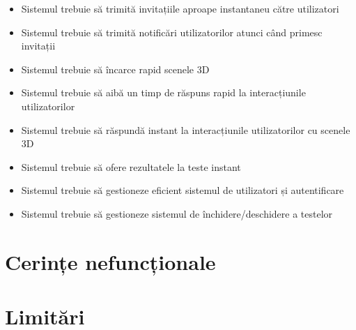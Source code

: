 \begin{itemize}
    \item Sistemul trebuie să trimită invitațiile aproape instantaneu către utilizatori
    \item Sistemul trebuie să trimită notificări utilizatorilor atunci când primesc invitații
    \item Sistemul trebuie să încarce rapid scenele 3D
    \item Sistemul trebuie să aibă un timp de răspuns rapid la interacțiunile utilizatorilor
    \item Sistemul trebuie să răspundă instant la interacțiunile utilizatorilor cu scenele 3D
    \item Sistemul trebuie să ofere rezultatele la teste instant
    \item Sistemul trebuie să gestioneze eficient sistemul de utilizatori și autentificare
    \item Sistemul trebuie să gestioneze sistemul de închidere/deschidere a testelor
\end{itemize}


\section{Cerințe nefuncționale}
\label{sec:proj-non-functional-requirements} 

\section{Limitări}
\label{sec:proj-limitations}
